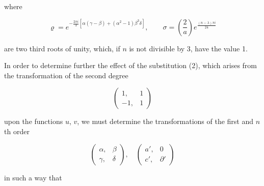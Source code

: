 

where

\[
\varrho = e^{-\frac{2\pi i}{3}\left[\alpha(\gamma-\beta)+(\alpha^2-1)\beta^3\delta\right]}, \qquad \sigma = \left(\frac{2}{a}\right) e^{\frac{(n-\lambda)\pi i}{24}} %
\]

are two third roots of unity, which, if $n$ is not divisible by 3,
have the value 1.

In order to determine further the effect of the substitution (2),
which arises from the transformation of the second degree

\[
\begin{pmatrix} 1, & 1 \\ -1, & 1 \end{pmatrix}
\]

upon the functions $u$, $v$, we must determine the transformations
of the first and $n$th order

\[
\begin{pmatrix} \alpha, & \beta \\ \gamma, & \delta \end{pmatrix}, \quad \begin{pmatrix} a', & 0 \\ c', & \partial' \end{pmatrix}
\]

in such a way that

